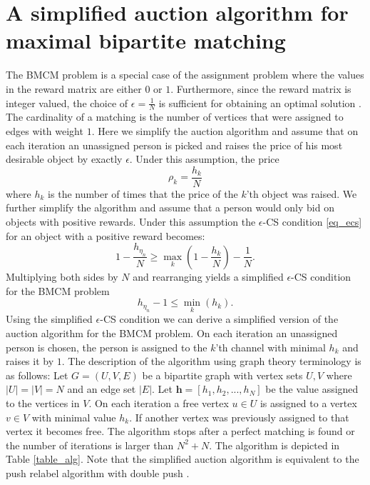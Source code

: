 \documentclass[11pt,onecolumn]{article}
\newcommand{\beq}{\begin{equation}}
\newcommand{\eeq}{\end{equation}}
\begin{document}
\section{A simplified auction algorithm for maximal bipartite matching}
The BMCM problem is a special case of the assignment problem where the values in the reward matrix are either $0$ or $1$. Furthermore, since the reward matrix is integer valued, the choice of $\epsilon= \frac{1}{N}$ is sufficient for obtaining an optimal solution \cite{bertsekas1979distributed}. The cardinality of a matching is the number of vertices that were assigned to edges with weight $1$.
Here we simplify the auction algorithm and assume that on each iteration an unassigned person is picked and raises the price of his most desirable object by exactly $\epsilon$.  Under this assumption, the price
\beq
\rho_k=\frac{h_k}{N}
\eeq
where $h_k$ is the number of times that the price of the $k$'th object was raised.
We further simplify the algorithm and assume that a person would only bid on objects with positive rewards.
Under this assumption the $\epsilon$-CS condition \ref{eq_ecs} for an object with a positive reward becomes:
\beq
1-\frac{h_{\eta_n}}{N}\geq\max_k(1-\frac{h_k}{N})-\frac{1}{N}.
\eeq
Multiplying both sides by $N$ and rearranging yields a simplified $\epsilon$-CS condition for the BMCM problem
\beq\label{eq_ecs_bipart}
h_{\eta_n}-1\leq\min_k(h_k).
\eeq
Using the simplified $\epsilon$-CS condition we can derive a simplified version of the auction algorithm for the BMCM problem.
On each iteration an unassigned person is chosen, the person is assigned to the $k$'th channel with minimal $h_k$ and raises it by $1$.
The description of the algorithm using graph theory terminology is as follows:
Let $G=(U,V,E)$ be a bipartite graph with vertex sets $U,V$ where $|U|=|V|=N$ and an edge set $|E|$. Let $\textbf{h}=[h_1,h_2,...,h_N]$ be the value assigned to the vertices in $V$. On each iteration a free vertex $u\in U$ is  assigned to a vertex $v \in V$ with minimal value $h_k$. If another vertex was previously assigned to that vertex it becomes free. The algorithm stops after a perfect matching is found or the number of iterations is larger than $N^2+N$.
The algorithm is depicted in Table \ref{table_alg}. Note that the simplified auction algorithm is equivalent to the push relabel algorithm with double push \cite{goldberg1995efficient}.
\end{document}
